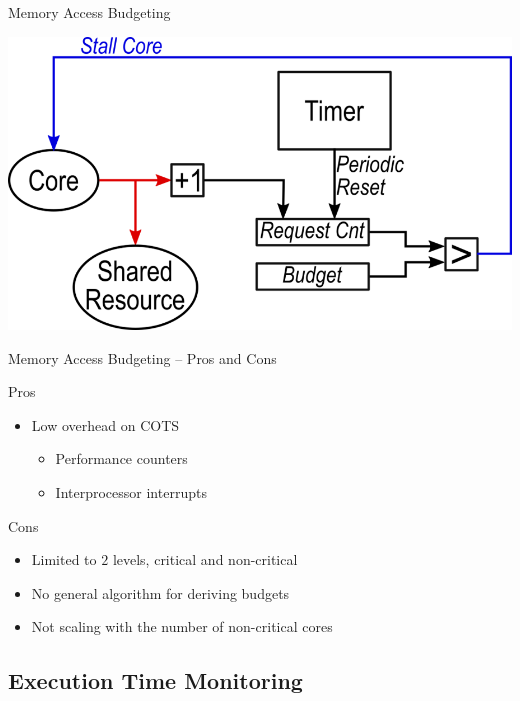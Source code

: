 \begin{frame}{Memory Access Budgeting}

\includegraphics[width=\textwidth]{Figures/budgeting-robin}

\end{frame}


\begin{frame}{Memory Access Budgeting -- Pros and Cons}


\begin{block}{Pros}
\begin{itemize}
    \item<2-> Low overhead on COTS
    \begin{itemize}
        \item<3-> Performance counters
        \item<3-> Interprocessor interrupts
    \end{itemize}
\end{itemize}
\end{block}

\vfill

\begin{block}{Cons}
\begin{itemize}
    \item<4-> Limited to $2$ levels, critical and non-critical
    \item<5-> No general algorithm for deriving budgets
    \item<6-> Not scaling with the number of non-critical cores
\end{itemize}
\end{block}

\end{frame}

\subsection{Execution Time Monitoring}


